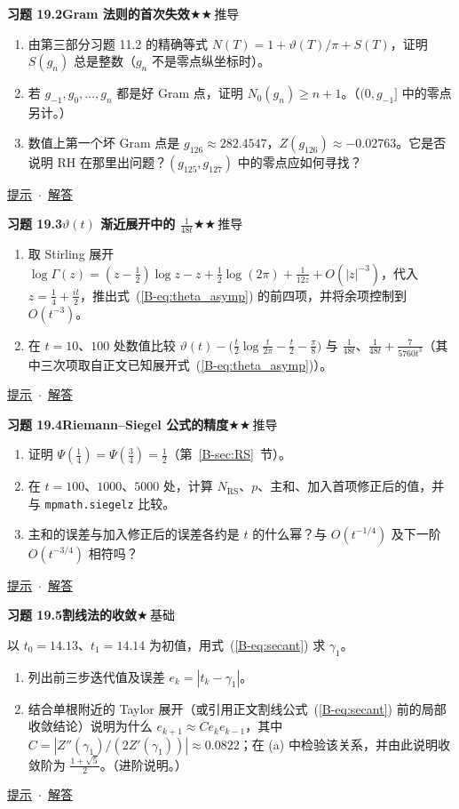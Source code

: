 \documentclass[11pt,a4paper]{article}
\newcommand{\bref}[1]{\ref*{B-#1}}
\newcommand{\lvI}{$\bigstar$\,基础}
\newcommand{\lvII}{$\bigstar\bigstar$\,推导}
\newcommand{\Q}[3]{%
  \par\addvspace{1.1em}\noindent
  \hypertarget{q:#1}{}\textbf{习题 #1}\quad\textbf{#3}\hfill{\small #2}\par
  \nopagebreak\smallskip}
\newcommand{\toHint}[1]{\hfill{\small\hyperlink{h:#1}{提示}\ $\cdot$\ \hyperlink{s:#1}{解答}}}
\begin{document}
\Q{19.2}{\lvII}{Gram 法则的首次失效}
\begin{enumerate}
  \item 由第三部分习题 11.2 的精确等式 $N(T)=1+\vartheta(T)/\pi+S(T)$，证明 $S(g_n)$ 总是整数（$g_n$ 不是零点纵坐标时）。
  \item 若 $g_{-1},g_0,\dots,g_n$ 都是好 Gram 点，证明 $N_0(g_n)\ge n+1$。（$(0,g_{-1}]$ 中的零点另计。）
  \item 数值上第一个坏 Gram 点是 $g_{126}\approx282.4547$，$Z(g_{126})\approx-0.02763$。它是否说明 RH 在那里出问题？$(g_{125},g_{127})$ 中的零点应如何寻找？
\end{enumerate}
\toHint{19.2}

\Q{19.3}{\lvII}{$\vartheta(t)$ 渐近展开中的 $\frac1{48t}$}
\begin{enumerate}
  \item 取 Stirling 展开 $\log\Gamma(z)=(z-\frac12)\log z-z+\frac12\log(2\pi)+\frac1{12z}+O(|z|^{-3})$，代入 $z=\frac14+\frac{it}2$，推出式~(\bref{eq:theta_asymp}) 的前四项，并将余项控制到 $O(t^{-3})$。
  \item 在 $t=10$、$100$ 处数值比较 $\vartheta(t)-\bigl(\frac t2\log\frac t{2\pi}-\frac t2-\frac\pi8\bigr)$ 与 $\frac1{48t}$、$\frac1{48t}+\frac7{5760t^3}$（其中三次项取自正文已知展开式~(\bref{eq:theta_asymp})）。
\end{enumerate}
\toHint{19.3}

\Q{19.4}{\lvII}{Riemann--Siegel 公式的精度}
\begin{enumerate}
  \item 证明 $\Psi(\frac14)=\Psi(\frac34)=\frac12$（第~\bref{sec:RS}~节）。
  \item 在 $t=100$、$1000$、$5000$ 处，计算 $N_{\mathrm{RS}}$、$p$、主和、加入首项修正后的值，并与 \texttt{mpmath.siegelz} 比较。
  \item 主和的误差与加入修正后的误差各约是 $t$ 的什么幂？与 $O(t^{-1/4})$ 及下一阶 $O(t^{-3/4})$ 相符吗？
\end{enumerate}
\toHint{19.4}

\Q{19.5}{\lvI}{割线法的收敛}
以 $t_0=14.13$、$t_1=14.14$ 为初值，用式~(\bref{eq:secant}) 求 $\gamma_1$。
\begin{enumerate}
  \item 列出前三步迭代值及误差 $e_k=|t_k-\gamma_1|$。
  \item 结合单根附近的 Taylor 展开（或引用正文割线公式~(\bref{eq:secant}) 前的局部收敛结论）说明为什么 $e_{k+1}\approx Ce_ke_{k-1}$，其中 $C=|Z''(\gamma_1)/(2Z'(\gamma_1))|\approx0.0822$；在 (a) 中检验该关系，并由此说明收敛阶为 $\frac{1+\sqrt5}2$。（进阶说明。）
\end{enumerate}
\toHint{19.5}
\end{document}
